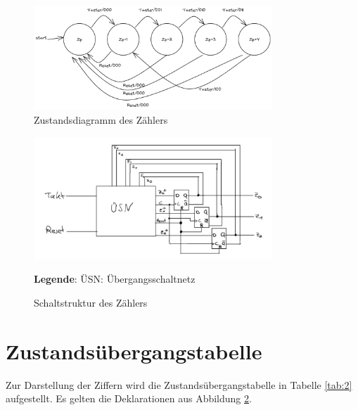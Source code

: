 \documentclass[
    paper=a4,
]{scrartcl}
\newcommand{\legend}[1]{\par\footnotesize\textbf{Legende}: #1\par}
\begin{document}
    \begin{figure}[h]
        \centering
        \includegraphics[width=0.8\textwidth]{Zustandsdiagramm.png}
        \caption{Zustandsdiagramm des Zählers}
        \label{fig:1}
    \end{figure}

    \begin{figure}
        \centering
        \includegraphics[width=0.8\textwidth]{Block.jpg}
        \caption{Schaltstruktur des Zählers}
        \label{fig:2}
        \legend{ÜSN: Übergangsschaltnetz}
    \end{figure}

\section{Zustandsübergangstabelle}
    Zur Darstellung der Ziffern wird die Zustandsübergangstabelle in Tabelle \ref{tab:2} aufgestellt. Es gelten die Deklarationen aus Abbildung \ref{fig:2}.
\end{document}
